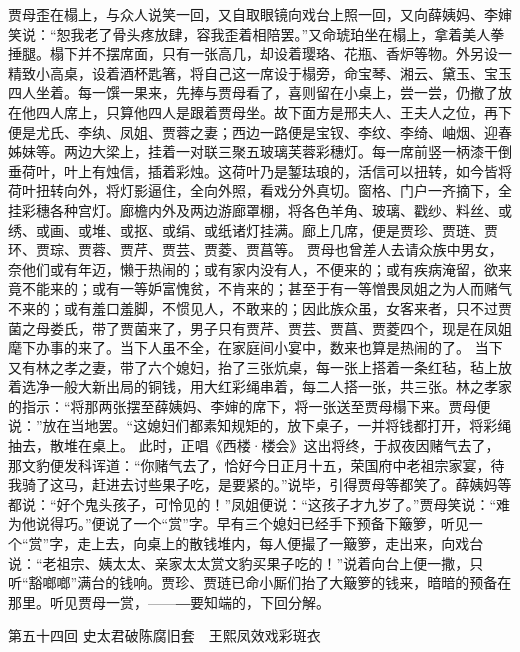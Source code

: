 \documentclass[12pt,oneside]{book}
\begin{document}
贾母歪在榻上，与众人说笑一回，又自取眼镜向戏台上照一回，又向薛姨妈、李婶笑说：“恕我老了骨头疼放肆，容我歪着相陪罢。”又命琥珀坐在榻上，拿着美人拳捶腿。榻下并不摆席面，只有一张高几，却设着璎珞、花瓶、香炉等物。外另设一精致小高桌，设着酒杯匙箸，将自己这一席设于榻旁，命宝琴、湘云、黛玉、宝玉四人坐着。每一馔一果来，先捧与贾母看了，喜则留在小桌上，尝一尝，仍撤了放在他四人席上，只算他四人是跟着贾母坐。故下面方是邢夫人、王夫人之位，再下便是尤氏、李纨、凤姐、贾蓉之妻；西边一路便是宝钗、李纹、李绮、岫烟、迎春姊妹等。两边大梁上，挂着一对联三聚五玻璃芙蓉彩穗灯。每一席前竖一柄漆干倒垂荷叶，叶上有烛信，插着彩烛。这荷叶乃是錾珐琅的，活信可以扭转，如今皆将荷叶扭转向外，将灯影逼住，全向外照，看戏分外真切。窗格、门户一齐摘下，全挂彩穗各种宫灯。廊檐内外及两边游廊罩棚，将各色羊角、玻璃、戳纱、料丝、或绣、或画、或堆、或抠、或绢、或纸诸灯挂满。廊上几席，便是贾珍、贾琏、贾环、贾琮、贾蓉、贾芹、贾芸、贾菱、贾菖等。
贾母也曾差人去请众族中男女，奈他们或有年迈，懒于热闹的；或有家内没有人，不便来的；或有疾病淹留，欲来竟不能来的；或有一等妒富愧贫，不肯来的；甚至于有一等憎畏凤姐之为人而赌气不来的；或有羞口羞脚，不惯见人，不敢来的；因此族众虽，女客来者，只不过贾菌之母娄氏，带了贾菌来了，男子只有贾芹、贾芸、贾菖、贾菱四个，现是在凤姐麾下办事的来了。当下人虽不全，在家庭间小宴中，数来也算是热闹的了。
当下又有林之孝之妻，带了六个媳妇，抬了三张炕桌，每一张上搭着一条红毡，毡上放着选净一般大新出局的铜钱，用大红彩绳串着，每二人搭一张，共三张。林之孝家的指示：“将那两张摆至薛姨妈、李婶的席下，将一张送至贾母榻下来。贾母便说：”放在当地罢。“这媳妇们都素知规矩的，放下桌子，一并将钱都打开，将彩绳抽去，散堆在桌上。
此时，正唱《西楼·楼会》这出将终，于叔夜因赌气去了，那文豹便发科诨道：“你赌气去了，恰好今日正月十五，荣国府中老祖宗家宴，待我骑了这马，赶进去讨些果子吃，是要紧的。”说毕，引得贾母等都笑了。薛姨妈等都说：“好个鬼头孩子，可怜见的！”凤姐便说：“这孩子才九岁了。”贾母笑说：“难为他说得巧。”便说了一个“赏”字。早有三个媳妇已经手下预备下簸箩，听见一个“赏”字，走上去，向桌上的散钱堆内，每人便撮了一簸箩，走出来，向戏台说：“老祖宗、姨太太、亲家太太赏文豹买果子吃的！”说着向台上便一撒，只听“豁啷啷”满台的钱响。贾珍、贾琏已命小厮们抬了大簸箩的钱来，暗暗的预备在那里。听见贾母一赏，——―要知端的，下回分解。
 
 
第五十四回  史太君破陈腐旧套　王熙凤效戏彩斑衣
\end{document}
